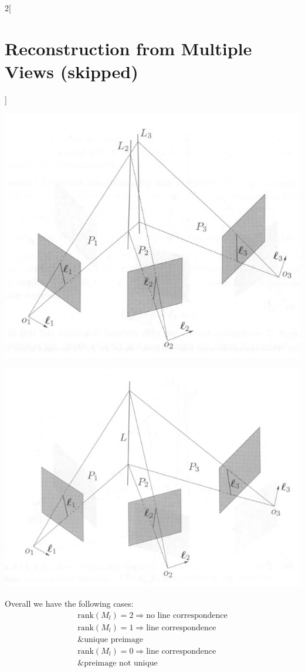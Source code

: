 \documentclass[oneside,fontsize=11pt,paper=a4]{scrartcl}
\newenvironment{myfigure}
  {\par\medskip\noindent\minipage{\linewidth}}
  {\endminipage\par\medskip}
\begin{document}
\begin{multicols}{2}[\section{Reconstruction from Multiple Views (skipped)}]
\begin{myfigure}
 \centering
 \includegraphics[width=0.8\linewidth]{Images/Preimage_no_line.jpg}
\end{myfigure}

\begin{myfigure}
 \centering
 \includegraphics[width=0.8\linewidth]{Images/Preimage_line.jpg}
\end{myfigure}

Overall we have the following cases:
\begin{equation*}
\begin{split}
    \text{rank}(M_l) = 2 \Rightarrow \text{no line correspondence} \\
    \text{rank}(M_l) = 1 \Rightarrow \text{line correspondence} \\ \text{\& unique preimage} \\
    \text{rank}(M_l) = 0 \Rightarrow \text{line correspondence} \\ \text{\& preimage not unique}
\end{split}
\end{equation*}


\end{multicols}
\end{document}

